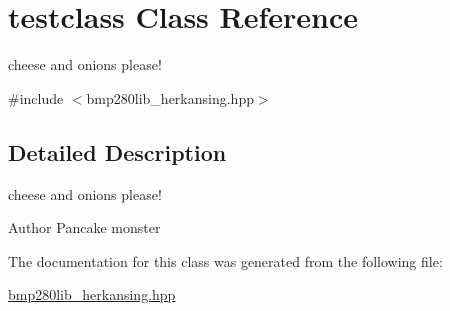 \hypertarget{classtestclass}{}\section{testclass Class Reference}
\label{classtestclass}


cheese and onions please!  




{\ttfamily \#include $<$bmp280lib\+\_\+herkansing.\+hpp$>$}



\subsection{Detailed Description}
cheese and onions please! 

\begin{DoxyAuthor}{Author}
Pancake monster 
\end{DoxyAuthor}


The documentation for this class was generated from the following file\+:\begin{DoxyCompactItemize}
\item 
\mbox{\hyperlink{bmp280lib__herkansing_8hpp}{bmp280lib\+\_\+herkansing.\+hpp}}\end{DoxyCompactItemize}
